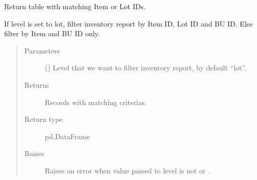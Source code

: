 \documentclass[letterpaper,10pt,english]{sphinxmanual}
\begin{document}
\begin{fulllineitems}
\begin{fulllineitems}
\begin{quote}
\begin{description}
\end{description}\end{quote}

\end{fulllineitems}


\begin{fulllineitems}
\label{\detokenize{source/optimization.datatools:optimization.datatools.extra_output.FindLot.expire_status}}
\end{fulllineitems}


\begin{fulllineitems}
\label{\detokenize{source/optimization.datatools:optimization.datatools.extra_output.FindLot.get_status}}
Return table with matching Item or Lot IDs.

If level is set to lot, filter inventory report by Item ID, Lot ID and BU ID.
Else filter by Item and BU ID only.
\begin{quote}\begin{description}
\item[{Parameters}] \leavevmode
{} (\sphinxstyleliteralemphasis{\sphinxupquote{, }}) \textendash{} Level that we want to filter inventory report, by default “lot”.

\item[{Returns}] \leavevmode
Records with matching criterias.

\item[{Return type}] \leavevmode
pd.DataFrame

\item[{Raises}] \leavevmode
{} \textendash{} Raises an error when value passed to level is not  or .


\end{description}
\end{quote}
\end{fulllineitems}
\end{fulllineitems}
\end{document}
